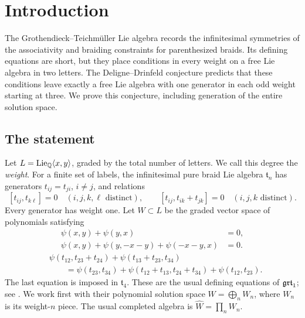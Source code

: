 \section{Introduction}\label{sec:introduction}

The Grothendieck--Teichm\"uller Lie algebra records the infinitesimal
symmetries of the associativity and braiding constraints for
parenthesized braids.  Its defining equations are short, but they place
conditions in every weight on a free Lie algebra in two letters.
The Deligne--Drinfeld conjecture predicts that these conditions leave
exactly a free Lie algebra with one generator in each odd weight
starting at three.  We prove this conjecture, including generation of
the entire solution space.

\subsection{The statement}
Let \(L=\operatorname{Lie}_{\mathbb Q}\langle x,y\rangle\), graded by the total number of
letters.  We call this degree the \emph{weight}.  For a finite set of
labels, the infinitesimal pure braid Lie algebra \(\mathfrak t_n\)
has generators \(t_{ij}=t_{ji}\), \(i\ne j\), and relations
\begin{equation}\label{eq:braid-relations}
 [t_{ij},t_{k\ell}]=0\quad(i,j,k,\ell\text{ distinct}),\qquad
 [t_{ij},t_{ik}+t_{jk}]=0\quad(i,j,k\text{ distinct}).
\end{equation}
Every generator has weight one.
Let \(W\subset L\) be the graded vector space of polynomials satisfying
\begin{align}
 \psi(x,y)+\psi(y,x)&=0,\label{eq:antisymmetry}\\
 \psi(x,y)+\psi(y,-x-y)+\psi(-x-y,x)&=0.\label{eq:three-term}
\end{align}
\begin{equation}\label{eq:pentagon}
\begin{aligned}
 &\psi(t_{12},t_{23}+t_{24})+\psi(t_{13}+t_{23},t_{34})\\
 &\qquad=
 \psi(t_{23},t_{34})+\psi(t_{12}+t_{13},t_{24}+t_{34})
 +\psi(t_{12},t_{23}).
\end{aligned}
\end{equation}
The last equation is imposed in \(\mathfrak t_4\).
These are the usual defining equations of \(\mathfrak{grt}_1\);
see \cite[Section~6.1]{Willwacher}.  We work first with their polynomial
solution space \(W=\bigoplus_n W_n\), where \(W_n\) is its weight-\(n\)
piece.  The usual completed algebra is \(\widehat W=\prod_n W_n\).

